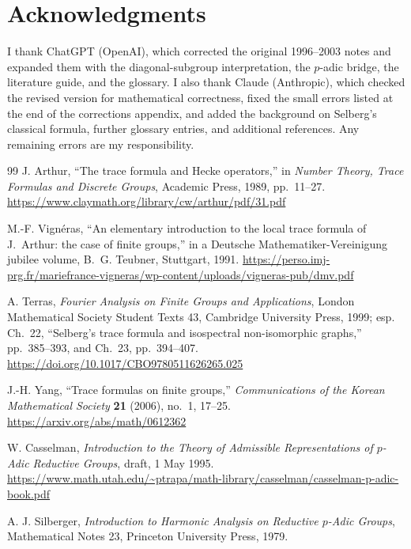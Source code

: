 \documentclass[12pt]{article}
\theoremstyle{remark}
\begin{document}
\section*{Acknowledgments}
I thank ChatGPT (OpenAI), which corrected the original 1996--2003
notes and expanded them with the diagonal-subgroup interpretation, the
$p$-adic bridge, the literature guide, and the glossary.  I also thank
Claude (Anthropic), which checked the revised version for mathematical
correctness, fixed the small errors listed at the end of the
corrections appendix, and added the background on Selberg's classical
formula, further glossary entries, and additional references.
Any remaining errors are my responsibility.

\begin{thebibliography}{99}
J. Arthur, ``The trace formula and Hecke operators,'' in
\emph{Number Theory, Trace Formulas and Discrete Groups},
Academic Press,
1989, pp.~11--27.
\url{https://www.claymath.org/library/cw/arthur/pdf/31.pdf}

M.-F. Vign\'eras, ``An elementary introduction to the local
trace formula of J.~Arthur: the case of finite groups,''
in a Deutsche Mathematiker-Vereinigung jubilee volume,
B.~G. Teubner, Stuttgart, 1991.
\url{https://perso.imj-prg.fr/mariefrance-vigneras/wp-content/uploads/vigneras-pub/dmv.pdf}

A. Terras, \emph{Fourier Analysis on Finite Groups and
Applications}, London Mathematical Society Student Texts 43,
Cambridge University Press, 1999; esp. Ch.~22,
``Selberg's trace formula and isospectral non-isomorphic
graphs,'' pp.~385--393, and Ch.~23, pp.~394--407.
\url{https://doi.org/10.1017/CBO9780511626265.025}

J.-H. Yang, ``Trace formulas on finite groups,''
\emph{Communications of the Korean Mathematical Society}
\textbf{21} (2006), no.~1, 17--25.
\url{https://arxiv.org/abs/math/0612362}

W. Casselman, \emph{Introduction to the Theory of Admissible
Representations of $p$-Adic Reductive Groups},
draft, 1 May 1995.
\url{https://www.math.utah.edu/~ptrapa/math-library/casselman/casselman-p-adic-book.pdf}

A. J. Silberger, \emph{Introduction to Harmonic Analysis on
Reductive $p$-Adic Groups}, Mathematical Notes 23, Princeton
University Press, 1979.


\end{thebibliography}
\end{document}
